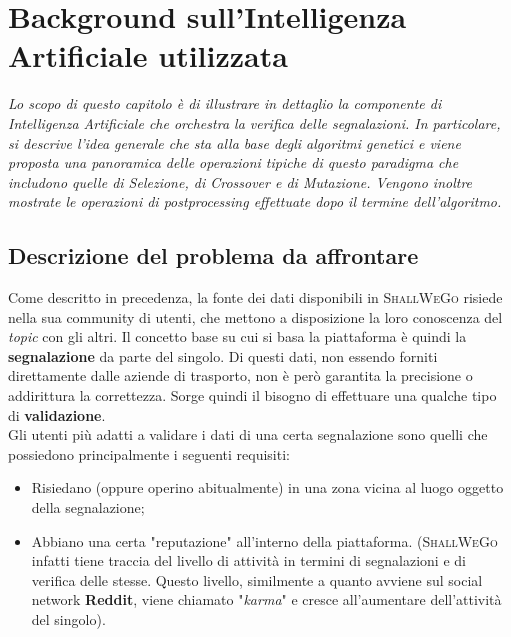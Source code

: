 \chapter{Background sull'Intelligenza Artificiale utilizzata} %
%

\begin{citazione}
    \textit{Lo scopo di questo capitolo è di illustrare in dettaglio la componente di Intelligenza Artificiale che orchestra la verifica delle segnalazioni. In particolare, si descrive l'idea generale che sta alla base degli algoritmi genetici e viene proposta una panoramica delle operazioni tipiche di questo paradigma che includono quelle di Selezione, di Crossover e di Mutazione. Vengono inoltre mostrate le operazioni di postprocessing effettuate dopo il termine dell'algoritmo.}
\end{citazione}

\newpage

\section{Descrizione del problema da affrontare}
    Come descritto in precedenza, la fonte dei dati disponibili in \textsc{ShallWeGo} risiede nella sua community di utenti, che mettono a disposizione la loro conoscenza del \textit{topic} con gli altri. Il concetto base su cui si basa la piattaforma è quindi la \textbf{segnalazione} da parte del singolo. Di questi dati, non essendo forniti direttamente dalle aziende di trasporto, non è però garantita la precisione o addirittura la correttezza. Sorge quindi il bisogno di effettuare una qualche tipo di \textbf{validazione}. \\
    Gli utenti più adatti a validare i dati di una certa segnalazione sono quelli che possiedono principalmente i seguenti requisiti:
    \begin{itemize}
        \item Risiedano (oppure operino abitualmente) in una zona vicina al luogo oggetto della segnalazione;
        \item Abbiano una certa "reputazione" all'interno della piattaforma. (\textsc{ShallWeGo} infatti tiene traccia del livello di attività in termini di segnalazioni e di verifica delle stesse. Questo livello, similmente a quanto avviene sul social network \textbf{Reddit}, viene chiamato "\textit{karma}" e cresce all'aumentare dell'attività del singolo).
    \end{itemize}

